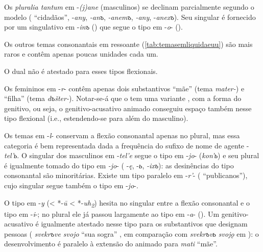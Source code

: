 

Os \emph{pluralia tantum} em -\emph{{(j)}ane} (masculinos) se
declinam parcialmente segundo o modelo ( 
``cidadãos'',  -\emph{any},  \emph{-anъ}, 
\emph{-anemъ},  \emph{-any},  -\emph{anexъ}).
Seu singular é fornecido por um singulativo em -\emph{inъ}
() que segue o tipo
em -\emph{o}- ().

Os outros temas consonantais em ressoante (\autoref{tab:temasemliquidaeuu}) são
mais raros e contêm apenas poucas unidades cada um.
\clearpage



O dual não é atestado para esses tipos flexionais.

Os femininos em -\emph{r}- contêm apenas dois substantivos 
``mãe'' (tema \emph{mater-}) e  ``filha'' (tema \emph{dъšter-}). 
Notar-se-á que o  tem uma variante , com a
forma do genitivo, ou seja, o genitivo-acusativo animado conseguiu espaço também
nesse tipo flexional (i.e., estendendo-se para além do masculino).

Os temas em -\emph{l}- conservam a flexão consonantal apenas no plural,
mas essa categoria é bem representada dada a frequência do sufixo de
nome de agente -\emph{tel'ь}. O singular dos masculinos em -\emph{tel'e}
segue o tipo em -\emph{jo}- (\emph{kon'ь}) e seu plural é igualmente
tomado do tipo em \emph{-jo}- ( -\emph{ę},  -\emph{ь},
 \emph{-ixъ}): as desinências do tipo consonantal são
minoritárias. Existe um tipo paralelo em -\emph{r'}- (
``publicanos''), cujo singular segue também o tipo em -\emph{jo}-.

O tipo em -\emph{y} (< *-\emph{ū} < *-\emph{uh\textsubscript{2}})
hesita no singular entre a flexão
consonantal e o tipo em -\emph{i}-; no plural ele já passou largamente
ao tipo em -\emph{a}- (). Um genitivo-acusativo é
igualmente atestado nesse tipo para os substantivos que designam pessoas
( \emph{svekrъve svojo} ``sua sogra''  , em
comparação com \emph{svekrъvь svojǫ} em ): o desenvolvimento
é paralelo à extensão do  animado para \emph{mati} ``mãe''.





